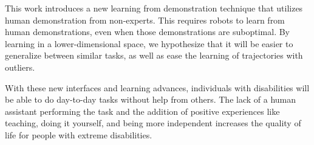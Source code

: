 \documentclass[letterpaper]{article}
\begin{document}
This work introduces a new learning from demonstration technique that utilizes human demonstration from non-experts. This requires robots to learn from human demonstrations, even when those demonstrations are suboptimal. By learning in a lower-dimensional space, we hypothesize that it will be easier to generalize between similar tasks, as well as ease the learning of trajectories with outliers.



With these new interfaces and learning advances, individuals with disabilities will be able to do day-to-day tasks without help from others. The lack of a human assistant performing the task and the addition of positive experiences like teaching, doing it yourself, and being more independent increases the quality of life for people with extreme disabilities.







\end{document}
